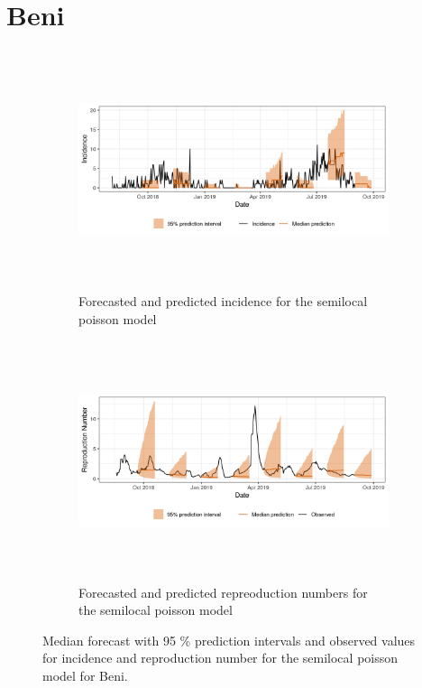  \section{ Beni }\begin{figure}[H]\begin{subfigure}{\textwidth}  \centering  \includegraphics[width=0.9\linewidth, height=7cm]{../output/Beni_predictions.png}  \caption{Forecasted and predicted incidence for the semilocal poisson model}\end{subfigure}

\begin{subfigure}{\textwidth}  \centering  \includegraphics[width=0.9\linewidth, height=7cm]{../output/Beni_Rs.png}  \caption{Forecasted and predicted repreoduction numbers for the semilocal poisson model}\end{subfigure}  \caption{Median forecast with 95 \% prediction intervals and observed values for incidence and reproduction number for the semilocal poisson model for Beni.}\end{figure}

